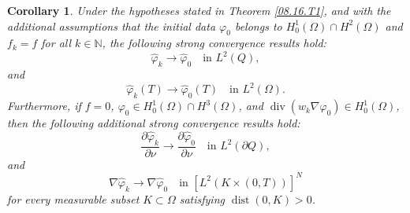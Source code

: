 \documentclass[11pt]{article}
\newtheorem{corollary}{Corollary}[section]
\numberwithin{equation}{section}
\DeclareMathOperator{\Div}{div}
\DeclareMathOperator{\dist}{dist}
\begin{document}
 \begin{corollary}\label{08.23.C1}
Under the hypotheses stated in Theorem \ref{08.16.T1}, and with the additional assumptions that the initial data $\varphi_0$ belongs to $H_0^1(\Omega) \cap H^2(\Omega)$ and $f_k = f$ for all $k \in \mathbb{N}$,  the following strong convergence results hold:
\begin{equation*}
\widehat{\varphi}_k \to \widehat{\varphi}_0   \quad \text{in } L^2(Q),
\end{equation*}
and
\begin{equation*}
\widehat{\varphi}_k(T) \to \widehat{\varphi}_0(T)   \quad \text{in } L^2(\Omega).
\end{equation*}
Furthermore, if $f = 0$, $\varphi_0 \in H_0^1(\Omega) \cap H^3(\Omega)$, and $\Div(w_k \nabla \varphi_0) \in H_0^1(\Omega)$, then the following additional strong convergence results hold:
\begin{equation*}
\frac{\partial \widehat{\varphi}_k}{\partial \nu} \to \frac{\partial \widehat{\varphi}_0}{\partial \nu}   \quad \text{in } L^2(\partial Q),
\end{equation*}
and
\begin{equation*}
\nabla \widehat{\varphi}_k \to \nabla \widehat{\varphi}_0   \quad \text{in } [L^2(K \times (0,T))]^N
\end{equation*}
for every measurable subset $K \subset \Omega$ satisfying $\dist(0, K) > 0$.
\end{corollary}
\end{document}

